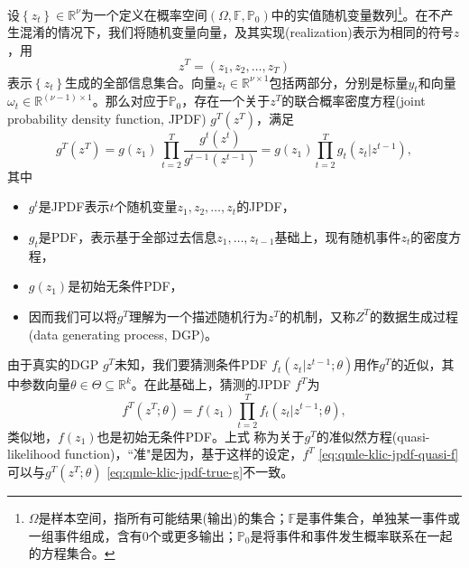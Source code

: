 设$\left\{ z_{t} \right\} \in \mathbb{R}^{\nu}$为一个定义在概率空间$\left( \Omega, \mathbb{F}, \mathbb{P}_{0} \right)$中的实值随机变量数列\footnote{
$\Omega$是样本空间，指所有可能结果(输出)的集合；$\mathbb{F}$是事件集合，单独某一事件或一组事件组成，含有0个或更多输出；$\mathbb{P}_{0}$是将事件和事件发生概率联系在一起的方程集合。}。在不产生混淆的情况下，我们将随机变量向量，及其实现(realization)表示为相同的符号$z$，用
\begin{equation*}
    z^{T} = \left( z_{1}, z_{2}, \ldots, z_{T} \right)
\end{equation*}
表示$\left\{ z_{t} \right\}$生成的全部信息集合。向量$z_{t} \in \mathbb{R}^{\nu \times 1}$包括两部分，分别是标量$y_{t}$和向量$\omega_{t} \in \mathbb{R}^{\left( \nu-1 \right) \times 1}$。那么对应于$\mathbb{P}_{0}$，存在一个关于$z^{T}$的联合概率密度方程(joint probability density function, JPDF) $g^{T}\left( z^{T} \right) $，满足
\begin{equation}
    \label{eq:qmle-klic-jpdf-true-g}
    g^{T} \left( z^{T} \right) = g\left( z_{1} \right)
    \, \prod_{t=2}^{T} \frac{g^{t} \left( z^{t} \right)}{g^{t-1} \left( z^{t-1} \right)}
    = g \left( z_{1} \right) \prod_{t=2}^{T} g_{t} \left(z_{t} | z^{t-1} \right),
\end{equation}
其中
\begin{itemize}
    \item $g^{t}$是JPDF表示$t$个随机变量$z_{1}, z_{2}, \ldots, z_{t}$的JPDF，
    \item $g_{t}$是PDF，表示基于全部过去信息$z_{1},\ldots,z_{t-1}$基础上，现有随机事件$z_{t}$的密度方程，
    \item $g \left( z_{1} \right)$是初始无条件PDF，
    \item 因而我们可以将$g^{T}$理解为一个描述随机行为$z^{T}$的机制，又称$Z^{T}$的数据生成过程(data generating process, DGP)。
\end{itemize}

由于真实的DGP $g^{T}$未知，我们要猜测条件PDF $f_{t} \left( z_{t} | z^{t-1} ; \theta \right)$用作$g^{T}$的近似，其中参数向量$\theta \in \Theta \subseteq \mathbb{R}^{k}$。在此基础上，猜测的JPDF $f^{T}$为
\begin{equation}
    \label{eq:qmle-klic-jpdf-quasi-f}
    f^{T} \left( z^{T}; \theta \right) = f \left( z_{1} \right)
    \prod_{t=2}^{T} f_{t} \left( z_{t} | z^{t-1} ; \theta \right),
\end{equation}
类似地，$f \left( z_{1} \right)$也是初始无条件PDF。上式
称为关于$g^{T}$的准似然方程(quasi-likelihood function)，``准"是因为，基于这样的设定，$f^{T}$ \eqref{eq:qmle-klic-jpdf-quasi-f}可以与$g^{T} \left( z^{T}; \theta \right)$ \eqref{eq:qmle-klic-jpdf-true-g}不一致。

